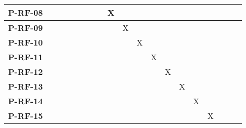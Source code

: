 \begin{table}[H]
{\begin{tabular}{|c|c|c|c|c|c|c|c|c|c|c|c|c|c|c|c|c|c|c|}
			\textbf{P-RF-08} &               &               &               &               &               &               &               & X             &               &               &               &               &               &               &               &               &               &               \\ \hline
			\textbf{P-RF-09} &               &               &               &               &               &               &               &               & X             &               &               &               &               &               &               &               &               &               \\ \hline
			\textbf{P-RF-10} &               &               &               &               &               &               &               &               &               & X             &               &               &               &               &               &               &               &               \\ \hline
			\textbf{P-RF-11} &               &               &               &               &               &               &               &               &               &               & X             &               &               &               &               &               &               &               \\ \hline
			\textbf{P-RF-12} &               &               &               &               &               &               &               &               &               &               &               & X             &               &               &               &               &               &               \\ \hline
			\textbf{P-RF-13} &               &               &               &               &               &               &               &               &               &               &               &               & X             &               &               &               &               &               \\ \hline
			\textbf{P-RF-14} &               &               &               &               &               &               &               &               &               &               &               &               &               & X             &               &               &               &               \\ \hline
			\textbf{P-RF-15} &               &               &               &               &               &               &               &               &               &               &               &               &               &               & X             &               &               &               \\ \hline

\end{tabular}}
\end{table}
